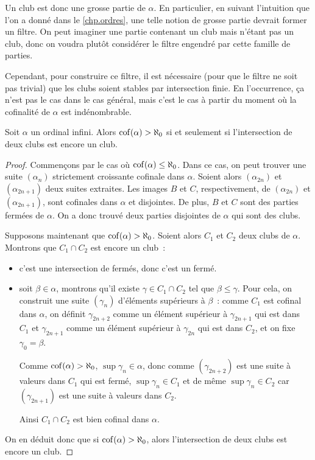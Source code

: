 Un club est donc une grosse partie de $\alpha$. En particulier, en suivant
l'intuition que l'on a donné dans le \cref{chp.ordres}, une telle notion de
grosse partie devrait former un filtre. On peut imaginer une partie contenant
un club mais n'étant pas un club, donc on voudra plutôt considérer le filtre
engendré par cette famille de parties.

Cependant, pour construire ce filtre, il est nécessaire (pour que le filtre ne
soit pas trivial) que les clubs soient stables par intersection finie. En
l'occurrence, ça n'est pas le cas dans le cas général, mais c'est le cas à
partir du moment où la cofinalité de $\alpha$ est indénombrable.

\begin{proposition}
  Soit $\alpha$ un ordinal infini. Alors $\operatorname{cof}(\alpha) > \aleph_0$ si et
  seulement si l'intersection de deux clubs est encore un club.
\end{proposition}

\begin{proof}
  Commençons par le cas où $\operatorname{cof}(\alpha) \leq \aleph_0$. Dans ce cas, on peut
  trouver une suite $(\alpha_n)$ strictement croissante cofinale dans $\alpha$.
  Soient alors $(\alpha_{2n})$ et $(\alpha_{2n+1})$ deux suites extraites. Les
  images $B$ et $C$, respectivement, de $(\alpha_{2n})$ et $(\alpha_{2n+1})$, sont
  cofinales dans $\alpha$ et disjointes. De plus, $B$ et $C$ sont des parties
  fermées de $\alpha$. On a donc trouvé deux parties disjointes de $\alpha$ qui
  sont des clubs.

  Supposons maintenant que $\operatorname{cof}(\alpha) > \aleph_0$. Soient alors $C_1$ et
  $C_2$ deux clubs de $\alpha$. Montrons que $C_1\cap C_2$ est encore un club~:
  \begin{itemize}
  \item c'est une intersection de fermés, donc c'est un fermé.
  \item soit $\beta \in \alpha$, montrons qu'il existe $\gamma \in C_1\cap C_2$
    tel que $\beta \leq \gamma$. Pour cela, on construit une suite $(\gamma_n)$
    d'éléments supérieurs à $\beta$~: comme $C_1$ est cofinal dans $\alpha$,
    on définit $\gamma_{2n+2}$ comme un élément supérieur à $\gamma_{2n+1}$ qui
    est dans $C_1$ et $\gamma_{2n+1}$ comme un élément supérieur à
    $\gamma_{2n}$ qui est dans $C_2$, et on fixe $\gamma_0 = \beta$.

    Comme $\operatorname{cof}(\alpha) > \aleph_0$, $\sup \gamma_n \in \alpha$, donc comme
    $(\gamma_{2n+2})$ est une suite à valeurs dans $C_1$ qui est fermé,
    $\sup \gamma_n \in C_1$ et de même $\sup \gamma_n \in C_2$ car
    $(\gamma_{2n+1})$ est une suite à valeurs dans $C_2$.

    Ainsi $C_1\cap C_2$ est bien cofinal dans $\alpha$.
  \end{itemize}
  On en déduit donc que si $\operatorname{cof}(\alpha) > \aleph_0$, alors l'intersection de
  deux clubs est encore un club.
\end{proof}

